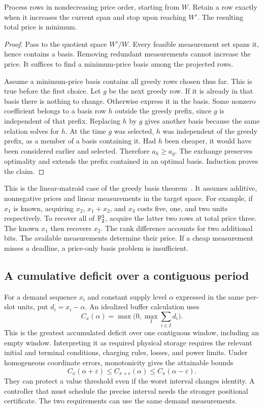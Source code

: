 \begin{proposition}\label{prop:measurementgreedy}
Process rows in nondecreasing price order, starting from $W$. Retain a row exactly when it increases the current span and stop upon reaching $W'$. The resulting total price is minimum.
\end{proposition}
\begin{proof}
Pass to the quotient space $W'/W$. Every feasible measurement set spans it, hence contains a basis. Removing redundant measurements cannot increase the price. It suffices to find a minimum-price basis among the projected rows.

Assume a minimum-price basis contains all greedy rows chosen thus far. This is true before the first choice. Let $g$ be the next greedy row. If it is already in that basis there is nothing to change. Otherwise express it in the basis. Some nonzero coefficient belongs to a basis row $h$ outside the greedy prefix, since $g$ is independent of that prefix. Replacing $h$ by $g$ gives another basis because the same relation solves for $h$. At the time $g$ was selected, $h$ was independent of the greedy prefix, as a member of a basis containing it. Had $h$ been cheaper, it would have been considered earlier and selected. Therefore $a_h\ge a_g$. The exchange preserves optimality and extends the prefix contained in an optimal basis. Induction proves the claim.
\end{proof}
This is the linear-matroid case of the greedy basis theorem~\cite{edmonds}. It assumes additive, nonnegative prices and linear measurements in the target space. For example, if $x_1$ is known, acquiring $x_2$, $x_1+x_2$, and $x_3$ costs five, one, and two units respectively. To recover all of $\mathbb F_2^3$, acquire the latter two rows at total price three. The known $x_1$ then recovers $x_2$. The rank difference accounts for two additional bits. The available measurements determine their price. If a cheap measurement misses a deadline, a price-only basis problem is insufficient.

\subsection{A cumulative deficit over a contiguous period}
For a demand sequence $x_i$ and constant supply level $\alpha$ expressed in the same per-slot units, put $d_i=x_i-\alpha$. An idealized buffer calculation uses
\[
 C_x(\alpha)=\max\bigl(0,\max_I\textstyle\sum_{i\in I} d_i\bigr).
\]
This is the greatest accumulated deficit over one contiguous window, including an empty window. Interpreting it as required physical storage requires the relevant initial and terminal conditions, charging rules, losses, and power limits. Under homogeneous coordinate errors, monotonicity gives the attainable bounds
\[
 C_x(\alpha+\varepsilon)\le C_{x+e}(\alpha)\le C_x(\alpha-\varepsilon).
\]
They can protect a value threshold even if the worst interval changes identity. A controller that must schedule the precise interval needs the stronger positional certificate. The two requirements can use the same demand measurements.

